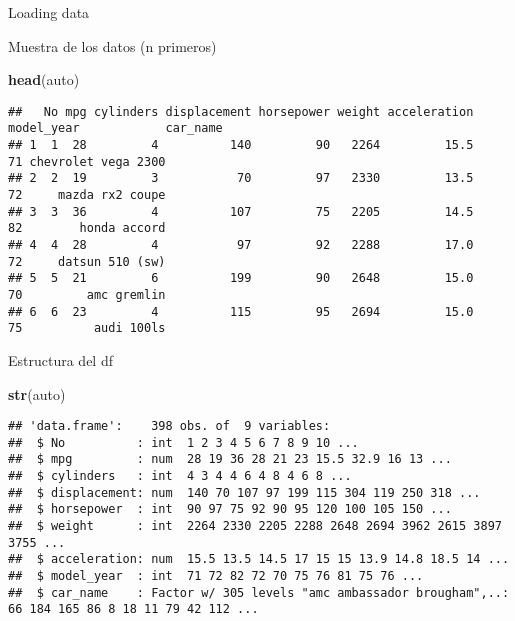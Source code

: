 \documentclass[
  ignorenonframetext,
]{beamer}
\newenvironment{Shaded}{\begin{snugshade}}{\end{snugshade}}
\newcommand{\KeywordTok}[1]{\textcolor[rgb]{0.13,0.29,0.53}{\textbf{#1}}}
\newcommand{\NormalTok}[1]{#1}
\begin{document}
\begin{frame}[fragile]{Loading data}
\protect\hypertarget{loading-data}{}

\begin{block}{Muestra de los datos (n primeros)}

\begin{Shaded}
\begin{Highlighting}[]
  \KeywordTok{head}\NormalTok{(auto)}
\end{Highlighting}
\end{Shaded}

\begin{verbatim}
##   No mpg cylinders displacement horsepower weight acceleration model_year            car_name
## 1  1  28         4          140         90   2264         15.5         71 chevrolet vega 2300
## 2  2  19         3           70         97   2330         13.5         72     mazda rx2 coupe
## 3  3  36         4          107         75   2205         14.5         82        honda accord
## 4  4  28         4           97         92   2288         17.0         72     datsun 510 (sw)
## 5  5  21         6          199         90   2648         15.0         70         amc gremlin
## 6  6  23         4          115         95   2694         15.0         75          audi 100ls
\end{verbatim}

\end{block}

\begin{block}{Estructura del df}

\begin{Shaded}
\begin{Highlighting}[]
  \KeywordTok{str}\NormalTok{(auto)}
\end{Highlighting}
\end{Shaded}

\begin{verbatim}
## 'data.frame':    398 obs. of  9 variables:
##  $ No          : int  1 2 3 4 5 6 7 8 9 10 ...
##  $ mpg         : num  28 19 36 28 21 23 15.5 32.9 16 13 ...
##  $ cylinders   : int  4 3 4 4 6 4 8 4 6 8 ...
##  $ displacement: num  140 70 107 97 199 115 304 119 250 318 ...
##  $ horsepower  : int  90 97 75 92 90 95 120 100 105 150 ...
##  $ weight      : int  2264 2330 2205 2288 2648 2694 3962 2615 3897 3755 ...
##  $ acceleration: num  15.5 13.5 14.5 17 15 15 13.9 14.8 18.5 14 ...
##  $ model_year  : int  71 72 82 72 70 75 76 81 75 76 ...
##  $ car_name    : Factor w/ 305 levels "amc ambassador brougham",..: 66 184 165 86 8 18 11 79 42 112 ...
\end{verbatim}


\end{block}
\end{frame}
\end{document}
